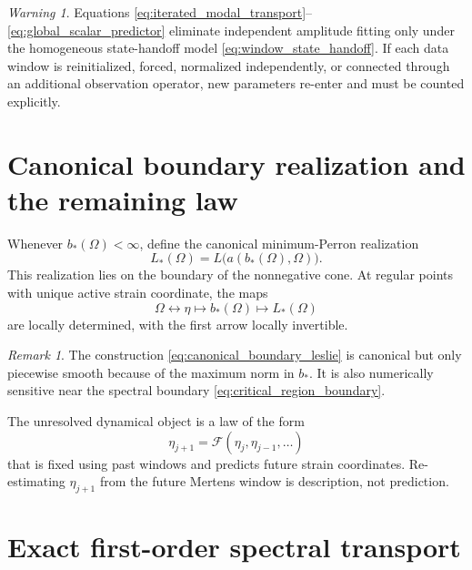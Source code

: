 \documentclass[11pt]{amsart}
\numberwithin{equation}{section}
\theoremstyle{plain}
\theoremstyle{definition}
\theoremstyle{remark}
\newtheorem{remark}[theorem]{Remark}
\newtheorem{warning}[theorem]{Warning}
\begin{document}
\begin{warning}
\label{warn:homogeneous_transport_assumption}
Equations \eqref{eq:iterated_modal_transport}--\eqref{eq:global_scalar_predictor} eliminate independent amplitude fitting only under the homogeneous state-handoff model \eqref{eq:window_state_handoff}.  If each data window is reinitialized, forced, normalized independently, or connected through an additional observation operator, new parameters re-enter and must be counted explicitly.
\end{warning}

\section{Canonical boundary realization and the remaining law}
\label{sec:canonical_boundary}

Whenever $b_*(\Omega)<\infty$, define the canonical minimum-Perron realization
\begin{equation}
L_*(\Omega)=L\bigl(a(b_*(\Omega),\Omega)\bigr).
\label{eq:canonical_boundary_leslie}
\end{equation}
This realization lies on the boundary of the nonnegative cone.  At regular points with unique active strain coordinate, the maps
\begin{equation}
\Omega
\longleftrightarrow
\eta
\longmapsto
b_*(\Omega)
\longmapsto
L_*(\Omega)
\label{eq:canonical_coordinate_chain}
\end{equation}
are locally determined, with the first arrow locally invertible.

\begin{remark}
\label{rem:canonical_not_smooth_everywhere}
The construction \eqref{eq:canonical_boundary_leslie} is canonical but only piecewise smooth because of the maximum norm in $b_*$.  It is also numerically sensitive near the spectral boundary \eqref{eq:critical_region_boundary}.
\end{remark}

The unresolved dynamical object is a law of the form
\begin{equation}
\eta_{j+1}
=\mathcal F(\eta_j,\eta_{j-1},\ldots)
\label{eq:eta_evolution_law}
\end{equation}
that is fixed using past windows and predicts future strain coordinates.  Re-estimating $\eta_{j+1}$ from the future Mertens window is description, not prediction.


\section{Exact first-order spectral transport}
\label{sec:first_order_transport}
\end{document}
